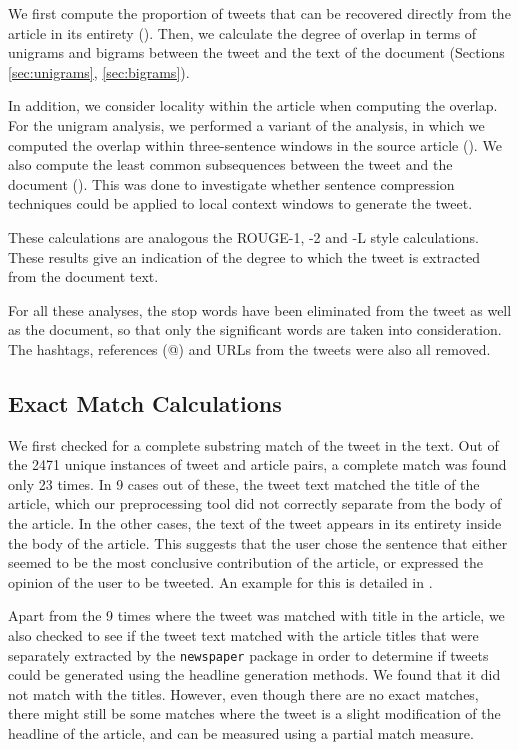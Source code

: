 We first compute the proportion of tweets that can be recovered directly from the article in its entirety (). Then, we calculate the degree of overlap in terms of unigrams and bigrams between the tweet and the text of the document (Sections \ref{sec:unigrams}, \ref{sec:bigrams}). 

In addition, we consider locality within the article when computing the overlap. For the unigram analysis, we performed a variant of the analysis, in which we computed the overlap within three-sentence windows in the source article (). We also compute the least common subsequences between the tweet and the document (). This was done to investigate whether sentence compression techniques could be applied to local context windows to generate the tweet.

These calculations are analogous the ROUGE-1, -2 and -L style calculations. These results give an indication of the degree to which the tweet is extracted from the document text. 

For all these analyses, the stop words have been eliminated from the tweet as well as the document, so that only the significant words are taken into consideration. The hashtags, references (@) and URLs from the tweets were also all removed. 

\subsection {Exact Match Calculations}
\label{sec:exact-match}
We first checked for a complete substring match of the tweet in the text. Out of the 2471 unique instances of tweet and article pairs, a complete match was found only 23 times. In 9 cases out of these, the tweet text matched the title of the article, which our preprocessing tool did not correctly separate from the body of the article. In the other cases, the text of the tweet appears in its entirety inside the body of the article. This suggests that the user chose the sentence that either seemed to be the most conclusive contribution of the article, or expressed the opinion of the user to be tweeted. An example for this is detailed in .

Apart from the 9 times where the tweet was matched with title in the article, we also checked to see if the tweet text matched with the article titles that were separately extracted by the \texttt{newspaper} package in order to determine if tweets could be generated using the headline generation methods. We found that it did not match with the titles. However, even though there are no exact matches, there might still be some matches where the tweet is a slight modification of the headline of the article, and can be measured using a partial match measure. 

